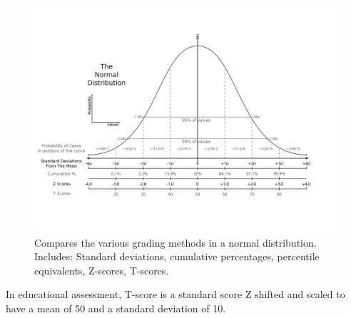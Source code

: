 \begin{figure}[h!]
\begin{center}
	\includegraphics[scale=0.15]{The_Normal_Distribution.png}
	\caption[]{Compares the various grading methods in a normal distribution. Includes: Standard deviations, cumulative percentages, percentile equivalents, Z-scores, T-scores.}
	\label{zscorecompare}
	\end{center}
	\end{figure}

In educational assessment, T-score is a standard score Z shifted and scaled to have a mean of 50 and a standard deviation of 10.
